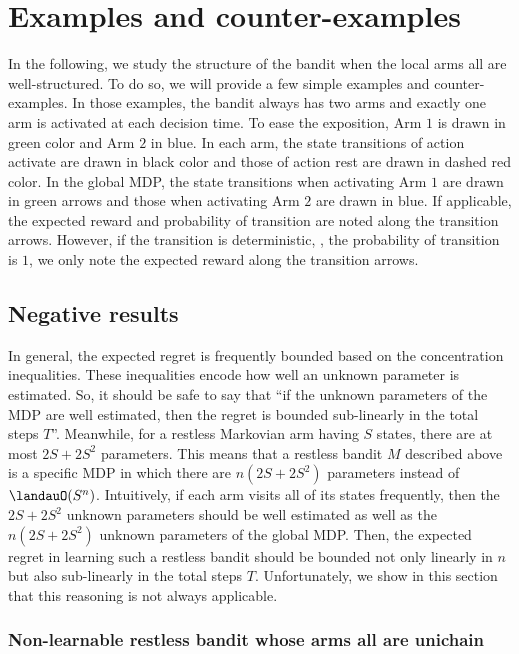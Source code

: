 \section{Examples and counter-examples}
\label{ch:restless:sec:example}

In the following, we study the structure of the bandit when the local arms all are well-structured.
To do so, we will provide a few simple examples and counter-examples.
In those examples, the bandit always has two arms and exactly one arm is activated at each decision time.
To ease the exposition, Arm $1$ is drawn in green color and Arm $2$ in blue.
In each arm, the state transitions of action activate are drawn in black color and those of action rest are drawn in dashed red color.
In the global MDP, the state transitions when activating Arm $1$ are drawn in green arrows and those when activating Arm $2$ are drawn in blue.
If applicable, the expected reward and probability of transition are noted along the transition arrows.
However, if the transition is deterministic, \ie, the probability of transition is $1$, we only note the expected reward along the transition arrows.

\subsection{Negative results}

In general, the expected regret is frequently bounded based on the concentration inequalities. 
These inequalities encode how well an unknown parameter is estimated.
So, it should be safe to say that ``if the unknown parameters of the MDP are well estimated, then the regret is bounded sub-linearly in the total steps $T$''.
Meanwhile, for a restless Markovian arm having $S$ states, there are at most $2S+2S^2$ parameters.
This means that a restless bandit $M$ described above is a specific MDP in which there are $n(2S+2S^2)$ parameters instead of $\landauO(S^{n})$.
Intuitively, if each arm visits all of its states frequently, then the $2S+2S^2$ unknown parameters should be well estimated as well as the $n(2S+2S^2)$ unknown parameters of the global MDP.
Then, the expected regret in learning such a restless bandit should be bounded not only linearly in $n$ but also sub-linearly in the total steps $T$.
Unfortunately, we show in this section that this reasoning is not always applicable. 

\subsubsection{Non-learnable restless bandit whose arms all are unichain}

